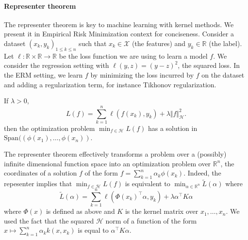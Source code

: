 \paragraph{Representer theorem} The representer theorem is key to machine learning with kernel methods. We present it in Empirical Risk Minimization context for conciseness. Consider a dataset $(x_k, y_k)_{1\leq k\leq n}$ such that $x_k\in\mathcal X$ (the features) and $y_k\in\mathbb R$ (the label). Let $\ell: \mathbb R \times\mathbb R\to\mathbb R$ be the loss function we are using to learn a model $f$. We consider the regression setting with $\ell(y, z) = (y - z) ^2$, the squared loss. In the ERM setting, we learn $f$ by minimizing the loss incurred by $f$ on the dataset and adding a regularization term, for instance Tikhonov regularization.

\begin{mdframed}
\begin{theorem}If $\lambda > 0$,
\begin{equation}
    L(f) = \sum_{k=1}^n \ell(f(x_k), y_k) + \lambda \Vert f \Vert_\mathcal H^2.
\end{equation}
then the optimization problem $\min_{f\in\mathcal H}L(f)$ has a solution in $\mathrm{Span}((\phi(x_1), \ldots, \phi(x_n))$.
\end{theorem}
\end{mdframed}

The representer theorem effectively transforms a problem over a (possibly) infinite dimensional function space into an optimization problem over $\mathbb R^n$, the coordinates of a solution $f$ of the form $f= \sum_{k=1}^n \alpha_k \phi(x_k)$. Indeed, the repesenter implies that $\min_{f\in\mathcal H}L(f)$ is equivalent to $\min_{\alpha\in\mathbb R^n}\tilde L(\alpha)$ where
\begin{equation}
\tilde L(\alpha) = \sum_{k=1}^n \ell(\Phi(x_k)^\top\alpha, y_k) + \lambda \alpha^\top K \alpha
\end{equation} where $\Phi(x)$ is defined as above and $K$ is the kernel matrix over $x_1, \ldots, x_n$. We used the fact that the squared $\mathcal H$ norm of a function of the form $x \mapsto \sum_{k=1}^n \alpha_k k(x, x_k)$ is equal to $\alpha^\top K \alpha$.


